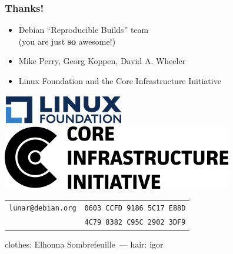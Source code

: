 \documentclass[14pt,aspectratio=169]{beamer}
\begin{document}
\begin{frame}
 \frametitle{Thanks!}

 \begin{itemize}
  \item Debian “Reproducible Builds” team \\
    {\small (you are just \textbf{so} awesome!)}
  \item Mike Perry, Georg Koppen, David A. Wheeler
  \item Linux Foundation and the Core Infrastructure Initiative
 \end{itemize}

 \begin{center}
  \includegraphics[height=0.1\paperheight]{images/linux_foundation_logo.png}
  \hspace{0.1\paperwidth}
  \includegraphics[height=0.1\paperheight]{images/cii_logo.png}
 \end{center}

 \vfill
 \begin{center}
  \begin{tabular}{rl}
   \texttt{lunar@debian.org} & \texttt{0603 CCFD 9186 5C17 E88D} \\
                             & \texttt{4C79 8382 C95C 2902 3DF9}
  \end{tabular}
 \vfill
 \begin{center}\footnotesize
  clothes: Elhonna Sombrefeuille — hair: igor
 \end{center}

 \end{center}
\end{frame}
\end{document}
